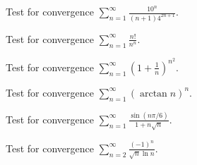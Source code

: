 \documentclass[
  course = {{MATH102 Calculus II}},
  quartile = {{2}},
  assignment = 23,%
  topic = {{11.6: The Ratio and Root Tests}},
  firstexercise = 1,
  term = 202
]{aga-homework}
\begin{document}
\newpage

\problem Test for convergence $\displaystyle \sum_{n=1}^{\infty}\frac{10^{n}}{(n+1)4^{2n+1}}$.

\newpage

\problem Test for convergence $\displaystyle \sum_{n=1}^{\infty}\frac{n!}{n^n}$.

\newpage

\problem Test for convergence $\displaystyle \sum_{n=1}^{\infty}\left(1+\frac{1}{n}\right)^{n^2}$.

\newpage

\problem Test for convergence $\displaystyle \sum_{n=1}^{\infty}\left(\arctan n\right)^n$.

\newpage

\problem Test for convergence $\displaystyle \sum_{n=1}^{\infty}\frac{\sin(n\pi/6)}{1+n\sqrt{n}}$.

\newpage

\problem Test for convergence $\displaystyle \sum_{n=2}^{\infty}\frac{(-1)^n}{\sqrt{n}\ln n}$.

\newpage
\afterpage{\null\newpage}

\afterpage{\null\newpage}

\afterpage{\null\newpage}
\end{document}
